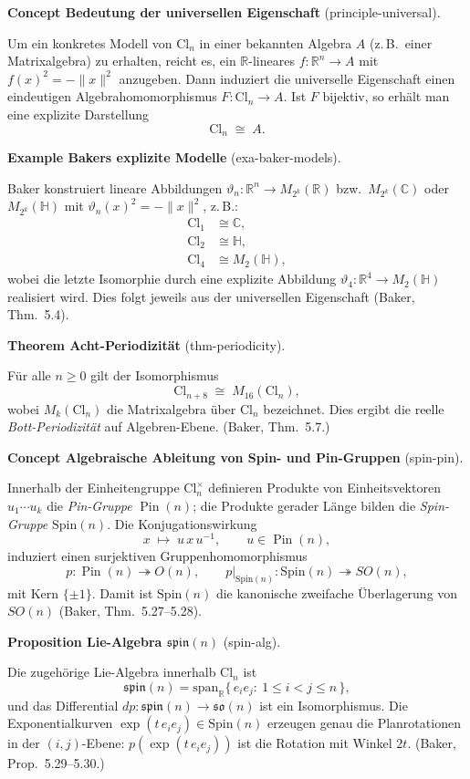 \documentclass[10pt, letterpaper]{article}
\newcommand{\R}{\mathbb{R}}
\newcommand{\C}{\mathbb{C}}
\newcommand{\QU}{\mathbb{H}}
\newcommand{\Cl}{\mathrm{Cl}}
\newcommand{\Spin}{\mathrm{Spin}}
\newcommand{\CustomHeading}[3]{%
  \par\medskip\noindent%
  \textbf{#1 #2} \textnormal{(#3)}.\enskip%
}
\newenvironment{PROP}[2]{\begin{unitbox}\CustomHeading{Proposition}{#1}{#2}}{\end{unitbox}}
\newenvironment{THEO}[2]{\begin{unitbox}\CustomHeading{Theorem}{#1}{#2}}{\end{unitbox}}
\newenvironment{EXA}[2]{\begin{unitbox}\CustomHeading{Example}{#1}{#2}}{\end{unitbox}}
\newenvironment{CONC}[2]{\begin{unitbox}\CustomHeading{Concept}{#1}{#2}}{\end{unitbox}}
\begin{document}
\begin{CONC}{Bedeutung der universellen Eigenschaft}{principle-universal}
Um ein konkretes Modell von $\Cl_n$ in einer bekannten Algebra $A$
(z.\,B.\ einer Matrixalgebra) zu erhalten,
reicht es, ein $\R$-lineares $f:\R^n\to A$ mit $f(x)^2=-\|x\|^2$
anzugeben.
Dann induziert die universelle Eigenschaft einen eindeutigen
Algebrahomomorphismus $F:\Cl_n\to A$.
Ist $F$ bijektiv, so erhält man eine explizite Darstellung
\[
\Cl_n\;\cong\;A.
\]
\end{CONC}

\begin{EXA}{Bakers explizite Modelle}{exa-baker-models}
Baker konstruiert lineare Abbildungen
$\vartheta_n:\R^n\to M_{2^k}(\R)$ bzw.\ $M_{2^k}(\C)$ oder $M_{2^k}(\QU)$
mit $\vartheta_n(x)^2=-\|x\|^2$, z.\,B.:
\begin{align*}
\Cl_1&\cong \C,\\
\Cl_2&\cong \QU,\\
\Cl_4&\cong M_2(\QU),
\end{align*}
wobei die letzte Isomorphie durch eine explizite Abbildung
$\vartheta_4:\R^4\to M_2(\QU)$ realisiert wird.
Dies folgt jeweils aus der universellen Eigenschaft
(Baker, Thm.~5.4).
\end{EXA}

\begin{THEO}{Acht-Periodizität}{thm-periodicity}
Für alle $n\ge0$ gilt der Isomorphismus
\[
\Cl_{n+8}\;\cong\;M_{16}(\Cl_n),
\]
wobei $M_k(\Cl_n)$ die Matrixalgebra über $\Cl_n$ bezeichnet.
Dies ergibt die reelle \emph{Bott-Periodizität} auf Algebren-Ebene.
(Baker, Thm.~5.7.)
\end{THEO}

\begin{CONC}{Algebraische Ableitung von Spin- und Pin-Gruppen}{spin-pin}
Innerhalb der Einheitengruppe $\Cl_n^\times$ definieren Produkte
von Einheitsvektoren $u_1\cdots u_k$ die
\emph{Pin-Gruppe} $\operatorname{Pin}(n)$;
die Produkte gerader Länge bilden die \emph{Spin-Gruppe} $\Spin(n)$.
Die Konjugationswirkung
\[
x\;\mapsto\;u\,x\,u^{-1},\qquad u\in\operatorname{Pin}(n),
\]
induziert einen surjektiven Gruppenhomomorphismus
\[
p:\operatorname{Pin}(n)\twoheadrightarrow O(n),\qquad
p|_{\Spin(n)}:\Spin(n)\twoheadrightarrow SO(n),
\]
mit Kern $\{\pm1\}$.
Damit ist $\Spin(n)$ die kanonische zweifache Überlagerung von $SO(n)$
(Baker, Thm.~5.27–5.28).
\end{CONC}

\begin{PROP}{Lie-Algebra $\mathfrak{spin}(n)$}{spin-alg}
Die zugehörige Lie-Algebra innerhalb $\Cl_n$ ist
\[
\mathfrak{spin}(n)
=\mathrm{span}_\R\{\,e_i e_j:\ 1\le i<j\le n\,\},
\]
und das Differential $dp:\mathfrak{spin}(n)\to\mathfrak{so}(n)$
ist ein Isomorphismus.
Die Exponentialkurven $\exp(t\,e_ie_j)\in\Spin(n)$ erzeugen
genau die Planrotationen in der $(i,j)$-Ebene:
$p(\exp(t\,e_ie_j))$ ist die Rotation mit Winkel $2t$.
(Baker, Prop.~5.29–5.30.)
\end{PROP}
\end{document}
